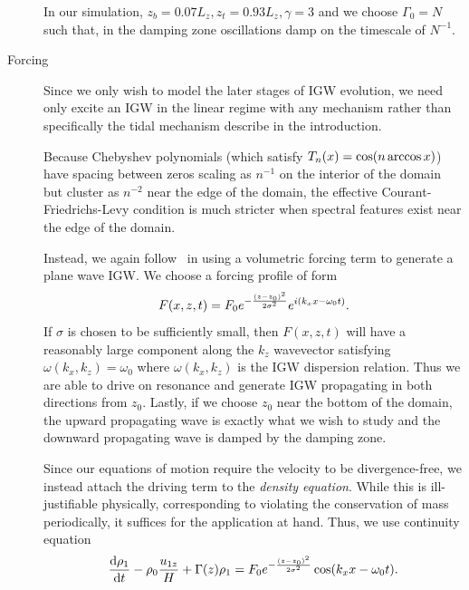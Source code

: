 \documentclass[11pt,
        usenames, %
        dvipsnames %
    ]{article}
\newcommand*{\rd}[2]{\frac{\mathrm{d}#1}{\mathrm{d}#2}}
\DeclarePairedDelimiter\p{\lparen}{\rparen}
\begin{document}
\begin{description}
        In our simulation, $z_b = 0.07L_z, z_t = 0.93L_z, \gamma = 3$ and we
        choose $\Gamma_0 = N$ such that, in the damping zone oscillations damp
        on the timescale of $N^{-1}$.

    \item[Forcing] Since we only wish to model the later stages of IGW
        evolution, we need only excite an IGW in the linear regime with any
        mechanism rather than specifically the tidal mechanism describe in the
        introduction.

        Because Chebyshev polynomials (which satisfy $T_n(x) = \cos
        \p*{n \arccos x}$) have spacing between zeros scaling as $n^{-1}$ on the
        interior of the domain but cluster as $n^{-2}$ near the edge of the
        domain, the effective Courant-Friedrichs-Levy condition is much stricter
        when spectral features exist near the edge of the
        domain\cite{GottliebCFL}.

        Instead, we again follow~\cite{LecoanetDamp} in using a volumetric
        forcing term to generate a plane wave IGW\@. We choose a forcing profile
        of form
        \begin{equation}
            F(x, z, t) = F_0
                e^{-\frac{\p*{z - z_0}^2}{2\sigma^2}}e^{i(k_xx - \omega_0 t)}.
        \end{equation}
        If $\sigma$ is chosen to be sufficiently small, then $F(x, z, t)$ will
        have a reasonably large component along the $k_z$ wavevector satisfying
        $\omega(k_x, k_z) = \omega_0$ where $\omega(k_x, k_z)$ is the IGW
        dispersion relation. Thus we are able to drive on resonance and generate
        IGW propagating in both directions from $z_0$. Lastly, if we choose
        $z_0$ near the bottom of the domain, the upward propagating wave is
        exactly what we wish to study and the downward propagating wave is
        damped by the damping zone.

        Since our equations of motion require the velocity to be
        divergence-free, we instead attach the driving term to the \emph{density
        equation}. While this is ill-justifiable physically, corresponding to
        violating the conservation of mass periodically, it suffices for the
        application at hand. Thus, we use continuity equation
        \begin{equation}
            \rd{\rho_1}{t} - \rho_0 \frac{u_{1z}}{H} + \Gamma(z) \rho_1
                = F_0 e^{-\frac{\p*{z - z_0}^2}{2\sigma^2}}
                    \cos(k_xx - \omega_0 t).
        \end{equation}


\end{description}
\end{document}

